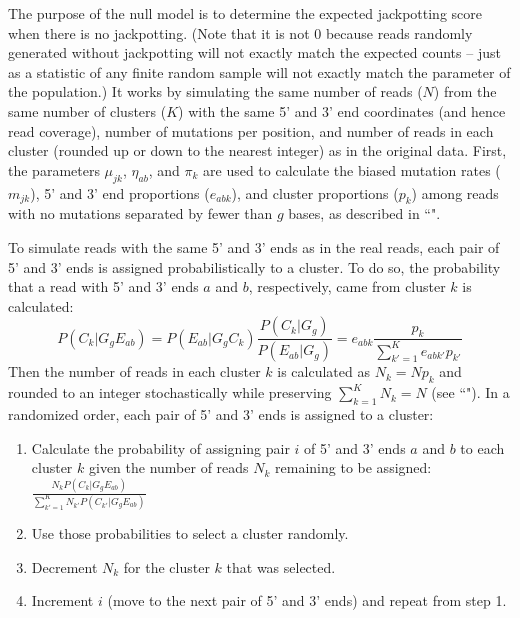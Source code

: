 \documentclass{article}
\begin{document}
The purpose of the null model is to determine the expected jackpotting score when there is no jackpotting.
(Note that it is not 0 because reads randomly generated without jackpotting will not exactly match the expected counts -- just as a statistic of any finite random sample will not exactly match the parameter of the population.)
It works by simulating the same number of reads ($N$) from the same number of clusters ($K$) with the same 5' and 3' end coordinates (and hence read coverage), number of mutations per position, and number of reads in each cluster (rounded up or down to the nearest integer) as in the original data.
First, the parameters $\mu_{jk}$, $\eta_{ab}$, and $\pi_k$ are used to calculate the biased mutation rates ($m_{jk}$), 5' and 3' end proportions ($e_{abk}$), and cluster proportions ($p_k$) among reads with no mutations separated by fewer than $g$ bases, as described in ``".

To simulate reads with the same 5' and 3' ends as in the real reads, each pair of 5' and 3' ends is assigned probabilistically to a cluster.
To do so, the probability that a read with 5' and 3' ends $a$ and $b$, respectively, came from cluster $k$ is calculated:
\begin{equation}
    P(C_k | G_g E_{ab}) = P(E_{ab} | G_g C_k) \frac{P(C_k | G_g)}{P(E_{ab} | G_g)} = e_{abk}\frac{p_k}{\sum_{k'=1}^K{e_{abk'}p_{k'}}}
\end{equation}
Then the number of reads in each cluster $k$ is calculated as $N_k = Np_k$ and rounded to an integer stochastically while preserving $\sum_{k=1}^{K}N_k = N$ (see ``").
In a randomized order, each pair of 5' and 3' ends is assigned to a cluster:
\begin{enumerate}
    \item Calculate the probability of assigning pair $i$ of 5' and 3' ends $a$ and $b$ to each cluster $k$ given the number of reads $N_k$ remaining to be assigned: $\frac{N_k P(C_k | G_g E_{ab})}{\sum_{k'=1}^K{N_{k'} P(C_{k'} | G_g E_{ab})}}$
    \item Use those probabilities to select a cluster randomly.
    \item Decrement $N_k$ for the cluster $k$ that was selected.
    \item Increment $i$ (move to the next pair of 5' and 3' ends) and repeat from step 1.
\end{enumerate}
\end{document}
